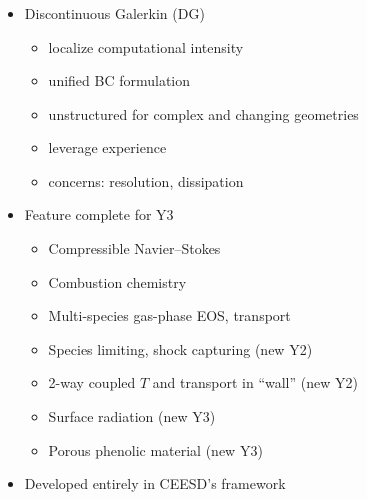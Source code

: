 \begin{frame}\frametitle{\ceesdcode{}
    }

  \begin{minipage}{0.65\textwidth}
    \begin{itemize}
      \setlength{\itemsep}{0.1in}
    \item Discontinuous Galerkin (DG)
      \vspace*{-0.04in}
      \begin{itemize}
      \item localize computational intensity
      \item unified BC formulation
      \item unstructured for complex and changing geometries
      \item leverage experience 
      \item concerns:  resolution, dissipation\xnew
      \end{itemize}
    \item Feature complete for Y3 
      \vspace*{-0.04in}
      \begin{itemize}
      \item Compressible Navier--Stokes
      \item Combustion chemistry
      \item Multi-species gas-phase EOS, transport
      \item Species limiting, shock
        capturing (new Y2) 
      \item 2-way coupled $T$ and  transport in ``wall'' (new Y2)
      \item Surface radiation (new Y3)\xnew
      \item Porous phenolic material (new Y3)\xnew
      \end{itemize}
    \item Developed entirely in CEESD's \ceesdMIRGE{} framework
    \end{itemize}
  \end{minipage}

\end{frame}
